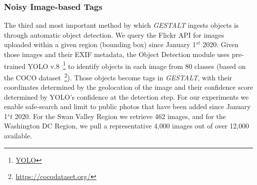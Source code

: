 \subsubsection{Noisy Image-based Tags}
The third and most important method by which \emph{GESTALT} ingests objects is through automatic object detection.
We query the Flickr API for images uploaded within a given region (bounding box) since January 1$^{st}$ 2020. 
Given those images and their EXIF metadata, the Object Detection module uses pre-trained YOLO v.8~\footnote{\href{https://github.com/ultralytics/ultralytics}{YOLO}} to identify objects in each image from 80 classes (based on the COCO dataset~\footnote{\href{{https://cocodataset.org/}}{https://cocodataset.org/}}). 
Those objects become tags in \emph{GESTALT}, with their coordinates determined by the geolocation of the image and their confidence score determined by YOLO's confidence at the detection step.
For our experiments we enable safe-search and limit to public photos that have been added since January 1$^st$ 2020. For the Swan Valley Region we retrieve 462 images, and for the Washington DC Region, we pull a representative 4,000 images out of over 12,000 available. 

